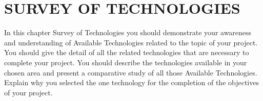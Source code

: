 
\chapter{SURVEY OF TECHNOLOGIES} %

\label{Chapter3} %


In this chapter Survey of Technologies you should demonstrate your awareness and understanding of Available Technologies related to the topic of your project. You should give the detail of all the related technologies that are necessary to complete your project. You should describe the technologies available in your chosen area and present a comparative study of all those Available Technologies. Explain why you selected the one technology for the completion of the objectives of your project.